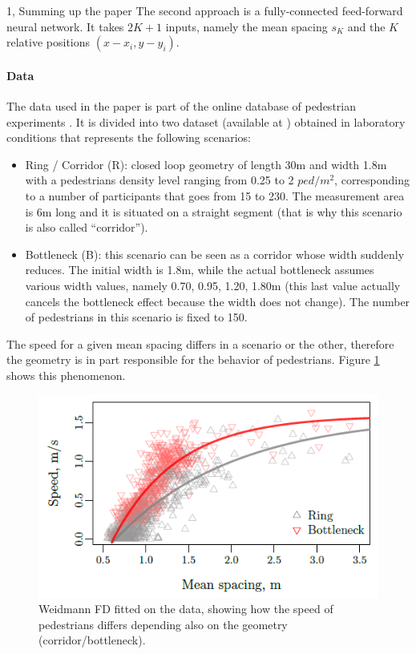\documentclass[10pt,a4paper]{article}
\begin{document}
\begin{task}{1, Summing up the paper}
The second approach is a fully-connected feed-forward neural network.
It takes $2K+1$ inputs, namely the mean spacing $s_K$ and the $K$ relative positions $(x - x_i, y - y_i)$.

\paragraph{Data}
The data used in the paper is part of the online database of pedestrian experiments \cite{pedestrians-database}.
It is divided into two dataset (available at \cite{datasets}) obtained in laboratory conditions that represents the following scenarios:
\begin{itemize}
    \item Ring / Corridor (R):
    closed loop geometry of length 30m and width 1.8m with a pedestrians density level ranging from 0.25 to 2 $ped/m^2$, corresponding to a number of participants that goes from 15 to 230.
    The measurement area is 6m long and it is situated on a straight segment (that is why this scenario is also called ``corridor'').
    
    \item Bottleneck (B):
    this scenario can be seen as a corridor whose width suddenly reduces.
    The initial width is 1.8m, while the actual bottleneck assumes various width values, namely 0.70, 0.95, 1.20, 1.80m (this last value actually cancels the bottleneck effect because the width does not change).
    The number of pedestrians in this scenario is fixed to 150.
\end{itemize}
The speed for a given mean spacing differs in a scenario or the other, therefore the geometry is in part responsible for the behavior of pedestrians.
Figure \ref{fig:fd-curves} shows this phenomenon.

\begin{figure}[h]
    \centering
    \includegraphics[scale=0.9]{images/speed_vs_mean_spacing_FD.png}
    \caption{Weidmann FD fitted on the data, showing how the speed of pedestrians differs depending also on the geometry (corridor/bottleneck).}
    \label{fig:fd-curves}
\end{figure}


\end{task}
\end{document}
